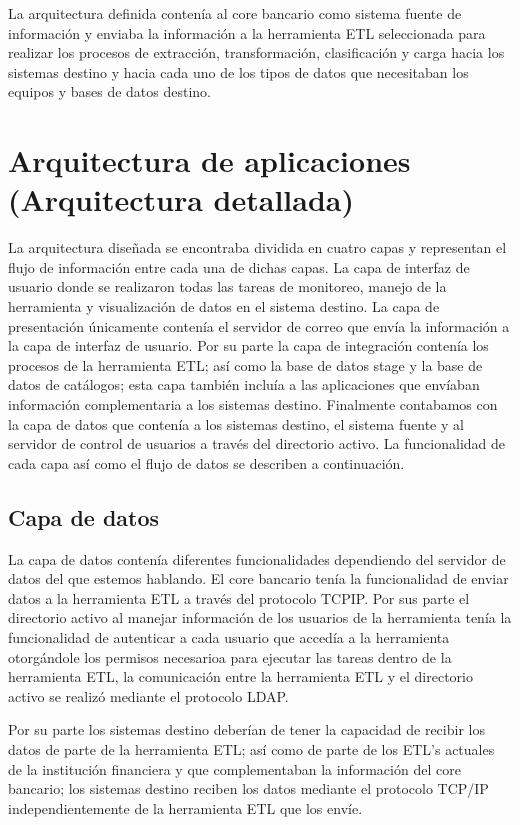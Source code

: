 \documentclass[a4paper,openright,12pt]{book}
\begin{document}
La arquitectura definida conten\'ia al core bancario como sistema fuente de informaci\'on y enviaba la informaci\'on a la herramienta ETL seleccionada para realizar los procesos de extracci\'on, transformaci\'on, clasificaci\'on y carga hacia los sistemas destino y hacia cada uno de los tipos de datos que necesitaban los equipos y bases de datos destino.


\section{Arquitectura de aplicaciones (Arquitectura detallada)}
La arquitectura dise\~nada se encontraba dividida en cuatro capas y representan el flujo de informaci\'on entre cada una de dichas capas. La capa de interfaz de usuario donde se realizaron todas las tareas de monitoreo, manejo de la herramienta y visualizaci\'on de datos en el sistema destino. La capa de presentaci\'on \'unicamente conten\'ia el servidor de correo que env\'ia la informaci\'on a la capa de interfaz de usuario. Por su parte la capa de integraci\'on conten\'ia los procesos de la herramienta ETL; as\'i como la base de datos stage y la base de datos de cat\'alogos; esta capa tambi\'en inclu\'ia a las aplicaciones que env\'iaban informaci\'on complementaria a los sistemas destino. Finalmente contabamos con la capa de datos que conten\'ia a los sistemas destino, el sistema fuente y al servidor de control de usuarios a trav\'es del directorio activo. La funcionalidad de cada capa as\'i como el flujo de datos se describen a continuaci\'on. 

\subsection{Capa de datos}
La capa de datos conten\'ia diferentes funcionalidades dependiendo del servidor de datos del que estemos hablando. El core bancario ten\'ia la funcionalidad de enviar datos a la herramienta ETL a trav\'es del protocolo TCP\/IP. Por sus parte el directorio activo al manejar informaci\'on de los usuarios de la herramienta ten\'ia la funcionalidad de autenticar a cada usuario que acced\'ia a la herramienta otorg\'andole los permisos necesarioa para ejecutar las tareas dentro de la herramienta ETL, la comunicaci\'on entre la herramienta ETL y el directorio activo se realiz\'o mediante el protocolo LDAP. 

Por su parte los sistemas destino deber\'ian de tener la capacidad de recibir los datos de parte de la herramienta ETL; as\'i como de parte de los ETL's actuales de la instituci\'on financiera y que complementaban la informaci\'on del core bancario; los sistemas destino reciben los datos mediante el protocolo TCP/IP independientemente de la herramienta ETL que los env\'ie.
\end{document}
